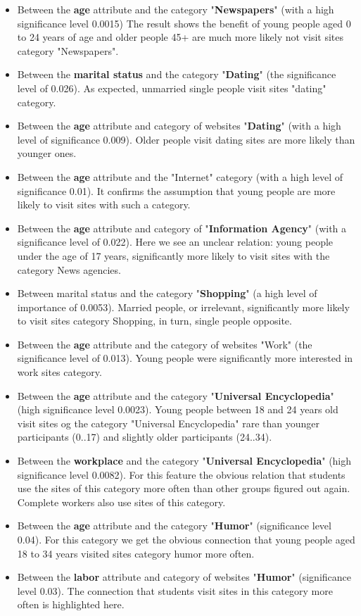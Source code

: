 \documentclass[runningheads,a4paper]{llncs}
\begin{document}
\begin{itemize}
	\item Between the \textbf{age} attribute and the category "\textbf{Newspapers}" (with a high significance level 0.0015) The result shows the benefit of young people aged 0 to 24 years of age and older people 45+ are much more likely not visit sites category "Newspapers".
	\item Between the \textbf{marital status} and the category "\textbf{Dating}" (the significance level of 0.026). As expected, unmarried single people visit sites "dating" category.
	\item Between the \textbf{age} attribute and category of websites "\textbf{Dating}" (with a high level of significance 0.009). Older people visit dating sites are more likely than younger ones.
	\item Between the \textbf{age} attribute and the "Internet" category (with a high level of significance 0.01). It confirms the assumption that young people are more likely to visit sites with such a category.
	\item Between the \textbf{age} attribute and category of "\textbf{Information Agency}" (with a significance level of 0.022). Here we see an unclear relation: young people under the age of 17 years, significantly more likely to visit sites with the category News agencies.
	\item Between marital status and the category "\textbf{Shopping}" (a high level of importance of 0.0053). Married people, or irrelevant, significantly more likely to visit sites category Shopping, in turn, single people opposite.
	\item Between the \textbf{age} attribute and the category of websites "Work" (the significance level of 0.013). Young people were significantly more interested in work sites category.
	\item Between the \textbf{age} attribute and the category "\textbf{Universal Encyclopedia}" (high significance level 0.0023). Young people between 18 and 24 years old visit sites og the category "Universal Encyclopedia" rare than younger participants (0..17) and slightly older participants (24..34).
	\item Between the \textbf{workplace} and the category "\textbf{Universal Encyclopedia}" (high significance level 0.0082). For this feature the obvious relation that students use the sites of this category more often than other groups figured out again. Complete workers also use sites of this category.
	\item Between the \textbf{age} attribute and the category "\textbf{Humor}" (significance level 0.04). For this category we get the obvious connection that young people aged 18 to 34 years visited sites category humor more often.
	\item Between the \textbf{labor} attribute and category of websites "\textbf{Humor}" (significance level 0.03). The connection that students visit sites in this category more often is highlighted here.
\end{itemize}
\end{document}
